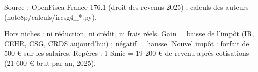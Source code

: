 Source : OpenFisca-France 176.1 (droit des revenus 2025) ; calculs des auteurs (note8p/calculs/ircsg4\_*.py).\par Hors niches : ni réduction, ni crédit, ni frais réels. Gain = baisse de l'impôt (IR, CEHR, CSG, CRDS aujourd'hui) ; négatif = hausse. Nouvel impôt : forfait de 500 € sur les salaires. Repères : 1 Smic = 19 200 € de revenu après cotisations (21 600 € brut par an, 2025).
